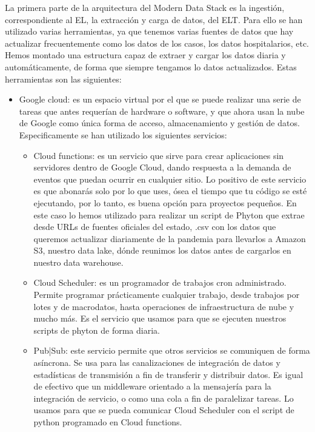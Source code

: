 La primera parte de la arquitectura del Modern Data Stack es la ingestión, correspondiente al EL, la extracción y carga de datos, del ELT. Para ello se han utilizado varias herramientas, ya que tenemos varias fuentes de datos que hay actualizar frecuentemente como los datos de los casos, los datos hospitalarios, etc. Hemos montado una estructura capaz de extraer y cargar los datos diaria y automáticamente, de forma que siempre tengamos lo datos actualizados. Estas herramientas son las siguientes:

\begin{itemize}
	\item Google cloud: \cite{google_cloud} es un espacio virtual por el que se puede realizar una serie de tareas que antes requerían de hardware o software, y que ahora usan la nube de Google como única forma de acceso, almacenamiento y gestión de datos. Especificamente se han utilizado los siguientes servicios:
	\begin{itemize}
    	\item Cloud functions: \cite{cloud_functions} es un servicio que sirve para crear aplicaciones sin servidores dentro de Google Cloud, dando respuesta a la demanda de eventos que puedan ocurrir en cualquier sitio. Lo positivo de este servicio es que abonarás solo por lo que uses, ósea el tiempo que tu código se esté ejecutando, por lo tanto, es buena opción para proyectos pequeños. En este caso lo hemos utilizado para realizar un script de Phyton \cite{Python} que extrae desde URLs de fuentes oficiales del estado, .csv con los datos que queremos actualizar diariamente de la pandemia para llevarlos a Amazon S3, nuestro data lake, dónde reunimos los datos antes de cargarlos en nuestro data warehouse.
    	\item Cloud Scheduler: \cite{cloud_scheduler} es un programador de trabajos cron administrado. Permite programar prácticamente cualquier trabajo, desde trabajos por lotes y de macrodatos, hasta operaciones de infraestructura de nube y mucho más. Es el servicio que usamos para que se ejecuten nuestros scripts de phyton de forma diaria.
    	\item Pub|Sub: \cite{pub/sub} este servicio permite que otros servicios se comuniquen de forma asíncrona. Se usa para las canalizaciones de integración de datos y estadísticas de transmisión a fin de transferir y distribuir datos. Es igual de efectivo que un middleware orientado a la mensajería para la integración de servicio, o como una cola a fin de paralelizar tareas. Lo usamos para que se pueda comunicar Cloud Scheduler con el script de python programado en Cloud functions.

\end{itemize}
\end{itemize}
